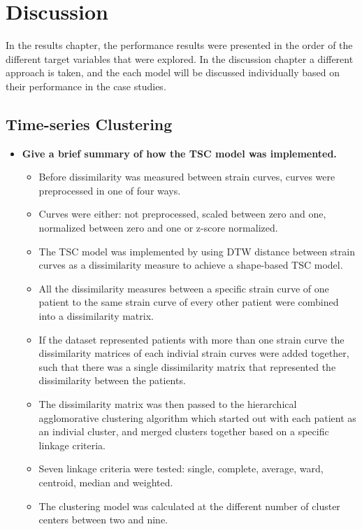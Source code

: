 \chapter{Discussion}

In the results chapter, the performance results were presented in the order of the different target variables that were explored. 
In the discussion chapter a different approach is taken, and the each model will be discussed individually based on their performance in the case studies.

\section{Time-series Clustering}

\begin{itemize}
    \item \textbf{Give a brief summary of how the TSC model was implemented.}
    \begin{itemize}
        \item Before dissimilarity was measured between strain curves, curves were preprocessed in one of four ways. 
        \item Curves were either: not preprocessed, scaled between zero and one, normalized between zero and one or z-score normalized.
        \item The TSC model was implemented by using DTW distance between strain curves as a dissimilarity measure to achieve a shape-based TSC model.
        \item All the dissimilarity measures between a specific strain curve of one patient to the same strain curve of every other patient were combined into a dissimilarity matrix.
        \item If the dataset represented patients with more than one strain curve the dissimilarity matrices of each indivial strain curves were added together,
              such that there was a single dissimilarity matrix that represented the dissimilarity between the patients.
        \item The dissimilarity matrix was then passed to the hierarchical agglomorative clustering algorithm which started out with each patient as an indivial cluster, 
              and merged clusters together based on a specific linkage criteria.
        \item Seven linkage criteria were tested: single, complete, average, ward, centroid, median and weighted.
        \item The clustering model was calculated at the different number of cluster centers between two and nine.

\end{itemize}
\end{itemize}
